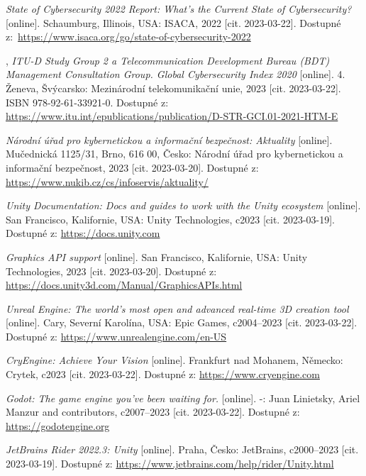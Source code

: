 \begin{flushleft}
\begin{thebibliography}{99}

\textit{State of Cybersecurity 2022 Report: What’s the Current State of Cybersecurity?} [online]. Schaumburg, Illinois, USA: ISACA, 2022 [cit. 2023-03-22]. Dostupné z:~\url{https://www.isaca.org/go/state-of-cybersecurity-2022}

, \textit{ITU-D Study Group 2 a Telecommunication Development Bureau (BDT) Management Consultation Group. Global Cybersecurity Index 2020} [online]. 4. Ženeva, Švýcarsko: Mezinárodní telekomunikační unie, 2023 [cit. 2023-03-22]. ISBN 978-92-61-33921-0. Dostupné z: \url{https://www.itu.int/epublications/publication/D-STR-GCI.01-2021-HTM-E}

\textit{Národní úřad pro kybernetickou a informační bezpečnost: Aktuality} [online]. Mučednická 1125/31, Brno, 616 00, Česko: Národní úřad pro kybernetickou a informační bezpečnost, 2023 [cit. 2023-03-20]. Dostupné z: \url{https://www.nukib.cz/cs/infoservis/aktuality/}

\textit{Unity Documentation: Docs and guides to work with the Unity ecosystem}  [online]. San Francisco, Kalifornie, USA: Unity Technologies, c2023 [cit. 2023-03-19]. \\Dostupné z: \href{https://docs.unity.com}{https://docs.unity.com}

\textit{Graphics API support} [online]. San Francisco, Kalifornie, USA: Unity Technologies, 2023 [cit. 2023-03-20]. Dostupné z: \href{https://docs.unity3d.com/Manual/GraphicsAPIs.html}{https://docs.unity3d.com/Manual/GraphicsAPIs.html}

\textit{Unreal Engine: The world’s most open and advanced real-time 3D creation tool} [online]. Cary, Severní Karolína, USA: Epic Games, c2004–2023 [cit. 2023-03-22]. Dostupné z: \url{https://www.unrealengine.com/en-US}

\textit{CryEngine: Achieve Your Vision} [online]. Frankfurt nad Mohanem, Německo: Crytek, c2023 [cit. 2023-03-22]. Dostupné z: \url{https://www.cryengine.com}

\textit{Godot: The game engine you've been waiting for.} [online]. -: Juan Linietsky, Ariel Manzur and contributors, c2007–2023 [cit. 2023-03-22]. Dostupné z: \url{https://godotengine.org}

\textit{JetBrains Rider 2022.3: Unity} [online]. Praha, Česko: JetBrains, c2000–2023 [cit. 2023-03-19]. Dostupné z: \href{https://www.jetbrains.com/help/rider/Unity.html}{https://www.jetbrains.com/help/rider/Unity.html}


\end{thebibliography}
\end{flushleft}
